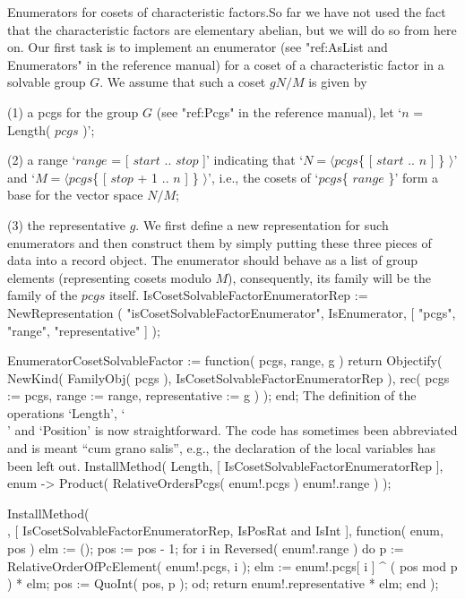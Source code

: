 {\bsf Enumerators for cosets of  characteristic factors.}\quad So far  we
have  not used the  fact that  the characteristic  factors are elementary
abelian, but we will do so from  here on. Our  first task is to implement
an enumerator (see "ref:AsList and  Enumerators" in the reference manual)
for a coset of a characteristic factor in a solvable group $G$. We assume
that such a coset $gN/M$ is given by
\beginlist
\item{(1)}  a pcgs for  the group  $G$ (see  "ref:Pcgs" in the  reference
  manual), let `$n$ = Length( $pcgs$ )';
\item{(2)} a range `$range$ = [ $start$  .. $stop$ ]' indicating that `$N
  =  \langle pcgs$\{ [ $start$  .. $n$ ] \} $\rangle$'  and `$M = \langle
  pcgs$\{  [  $stop$ + 1   .. $n$ ]  \} $\rangle$',  i.e.,  the cosets of
  `$pcgs$\{ $range$ \}' form a base for the vector space $N/M$;
\item{(3)} the representative $g$.
\endlist
We   first  define a  new representation  for   such enumerators and then
construct them by simply putting these three pieces of data into a record
object. The  enumerator  should  behave as  a   list of  group   elements
(representing cosets modulo $M$),   consequently, its family will  be the
family of the $pcgs$ itself.
\begintt
IsCosetSolvableFactorEnumeratorRep := NewRepresentation
    ( "isCosetSolvableFactorEnumerator", IsEnumerator,
                                [ "pcgs", "range", "representative" ] );

EnumeratorCosetSolvableFactor := function( pcgs, range, g )
    return Objectify( NewKind( FamilyObj( pcgs ),
                   IsCosetSolvableFactorEnumeratorRep ),
                   rec( pcgs := pcgs,
                       range := range,
              representative := g ) );
end;
\endtt
The definition of the operations `Length', `\\[\\]' and `Position' is now
straightforward. The  code has sometimes  been  abbreviated and is  meant
``cum grano salis'',  e.g.,  the declaration of  the local  variables has
been left out.
\begintt
InstallMethod( Length, [ IsCosetSolvableFactorEnumeratorRep ],
    enum -> Product( RelativeOrdersPcgs( enum!.pcgs ){ enum!.range } ) );
\endtt

\begintt
InstallMethod( \[\], [ IsCosetSolvableFactorEnumeratorRep,
        IsPosRat and IsInt ],
    function( enum, pos )
    elm := ();
    pos := pos - 1;
    for i  in Reversed( enum!.range )  do
        p := RelativeOrderOfPcElement( enum!.pcgs, i );
        elm := enum!.pcgs[ i ] ^ ( pos mod p ) * elm;
        pos := QuoInt( pos, p );
    od;
    return enum!.representative * elm;
end );
\endtt

